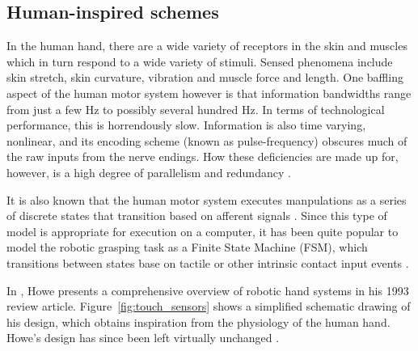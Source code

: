 \subsection{Human-inspired schemes}

In the human hand, there are a wide variety of receptors in the skin and muscles which in turn respond to a wide variety of stimuli.
Sensed phenomena include skin stretch, skin curvature, vibration and muscle force and length.
One baffling aspect of the human motor system however is that information bandwidths range from just a few Hz to possibly several hundred Hz.
In terms of technological performance, this is horrendously slow.
Information is also time varying, nonlinear, and its encoding scheme (known as pulse-frequency) obscures much of the raw inputs from the nerve endings.
How these deficiencies are made up for, however, is a high degree of parallelism and redundancy \cite{howe1993tactile}.

It is also known that the human motor system executes manpulations as a series of discrete states that transition based on afferent signals \cite{Johansson1984}.
Since this type of model is appropriate for execution on a computer, it has been quite popular to model the robotic grasping task as a Finite State Machine (FSM), which transitions between states base on tactile or other intrinsic contact input events \cite{leoni1998implementing, sikka1994tactile}.

In \cite{howe1993tactile}, Howe presents a comprehensive overview of robotic hand systems in his 1993 review article.
Figure~\ref{fig:touch_sensors} shows a simplified schematic drawing of his design, which obtains inspiration from the physiology of the human hand.
Howe's design has since been left virtually unchanged \cite{cutkosky2008force}.

